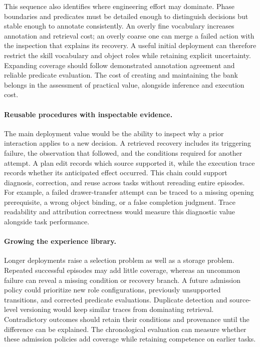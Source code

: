 \documentclass[10pt,twocolumn,letterpaper]{article}
\begin{document}
This sequence also identifies where engineering effort may dominate. Phase boundaries and predicates must be detailed enough to distinguish decisions but stable enough to annotate consistently. An overly fine vocabulary increases annotation and retrieval cost; an overly coarse one can merge a failed action with the inspection that explains its recovery. A useful initial deployment can therefore restrict the skill vocabulary and object roles while retaining explicit uncertainty. Expanding coverage should follow demonstrated annotation agreement and reliable predicate evaluation. The cost of creating and maintaining the bank belongs in the assessment of practical value, alongside inference and execution cost.

\paragraph{Reusable procedures with inspectable evidence.}
The main deployment value would be the ability to inspect why a prior interaction applies to a new decision. A retrieved recovery includes its triggering failure, the observation that followed, and the conditions required for another attempt. A plan edit records which source supported it, while the execution trace records whether its anticipated effect occurred. This chain could support diagnosis, correction, and reuse across tasks without rereading entire episodes. For example, a failed drawer-transfer attempt can be traced to a missing opening prerequisite, a wrong object binding, or a false completion judgment. Trace readability and attribution correctness would measure this diagnostic value alongside task performance.

\paragraph{Growing the experience library.}
Longer deployments raise a selection problem as well as a storage problem. Repeated successful episodes may add little coverage, whereas an uncommon failure can reveal a missing condition or recovery branch. A future admission policy could prioritize new role configurations, previously unsupported transitions, and corrected predicate evaluations. Duplicate detection and source-level versioning would keep similar traces from dominating retrieval. Contradictory outcomes should retain their conditions and provenance until the difference can be explained. The chronological evaluation can measure whether these admission policies add coverage while retaining competence on earlier tasks.
\end{document}
